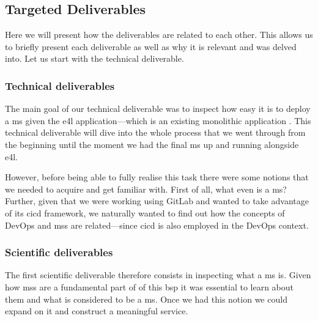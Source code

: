 \subsection{Targeted Deliverables}
\label{sec-deliverables}

Here we will present how the deliverables are related to each other.
This allows us to briefly present each deliverable as well as why it
is relevant and was delved into. Let us start with the technical
deliverable.



\subsubsection{Technical deliverables}

The main goal of our technical deliverable was to inspect how easy it
is to deploy a \gls{ms} given the \gls{e4l} application---which is an
existing monolithic application . This technical deliverable will dive into the whole
process that we went through from the beginning until the moment we
had the final \gls{ms} up and running alongside \gls{e4l}. 

However, before being able to fully realise this task there were some
notions that we needed to acquire and get familiar with. First of all,
what even is a \gls{ms}? Further, given that we were working using
GitLab and wanted to take advantage of its \gls{cicd} framework, we
naturally wanted to find out how the concepts of DevOps and \glspl{ms}
are related---since \gls{cicd} is also employed in the DevOps context.



\subsubsection{Scientific deliverables}

The first scientific deliverable therefore consists in inspecting
what a \gls{ms} is. Given how \glspl{ms} are a fundamental part of of
this \gls{bsp} it was essential to learn about them and what is
considered to be a \gls{ms}. Once we had this notion we could expand
on it and construct a meaningful service.

